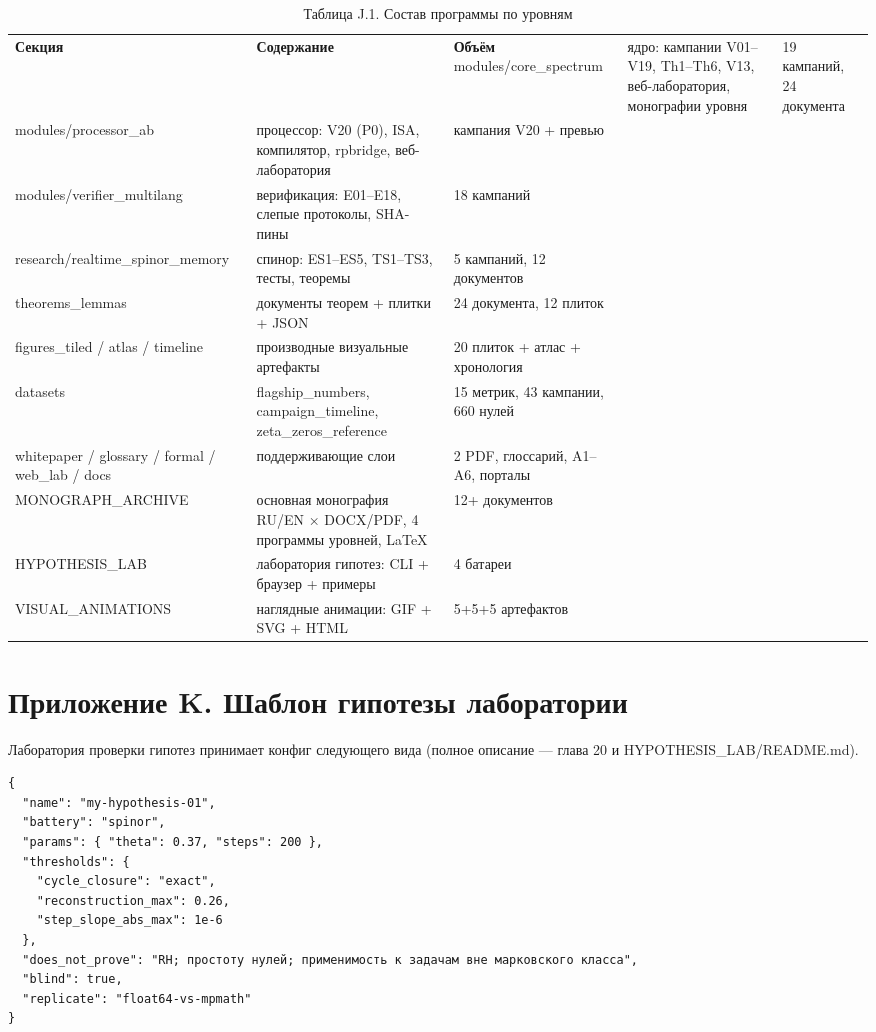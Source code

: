 \documentclass[11pt,a4paper]{article}
\begin{document}
\begin{table}[htbp]\centering\small
\caption{Таблица J.1. Состав программы по уровням}
\begin{tabular}{p{} p{} p{}}
\toprule
\textbf{Секция} & \textbf{Содержание} & \textbf{Объём}
\midrule
modules/core\_spectrum & ядро: кампании V01–V19, Th1–Th6, V13, веб-лаборатория, монографии уровня & 19 кампаний, 24 документа \\
modules/processor\_ab & процессор: V20 (P0), ISA, компилятор, rpbridge, веб-лаборатория & кампания V20 + превью \\
modules/verifier\_multilang & верификация: E01–E18, слепые протоколы, SHA-пины & 18 кампаний \\
research/realtime\_spinor\_memory & спинор: ES1–ES5, TS1–TS3, тесты, теоремы & 5 кампаний, 12 документов \\
theorems\_lemmas & документы теорем + плитки + JSON & 24 документа, 12 плиток \\
figures\_tiled / atlas / timeline & производные визуальные артефакты & 20 плиток + атлас + хронология \\
datasets & flagship\_numbers, campaign\_timeline, zeta\_zeros\_reference & 15 метрик, 43 кампании, 660 нулей \\
whitepaper / glossary / formal / web\_lab / docs & поддерживающие слои & 2 PDF, глоссарий, A1–A6, порталы \\
MONOGRAPH\_ARCHIVE & основная монография RU/EN × DOCX/PDF, 4 программы уровней, LaTeX & 12+ документов \\
HYPOTHESIS\_LAB & лаборатория гипотез: CLI + браузер + примеры & 4 батареи \\
VISUAL\_ANIMATIONS & наглядные анимации: GIF + SVG + HTML & 5+5+5 артефактов \\
\bottomrule
\end{tabular}
\end{table}

\section{Приложение K. Шаблон гипотезы лаборатории}

Лаборатория проверки гипотез принимает конфиг следующего вида (полное описание — глава 20 и HYPOTHESIS\_LAB/README.md).

\begin{verbatim}
{
  "name": "my-hypothesis-01",
  "battery": "spinor",
  "params": { "theta": 0.37, "steps": 200 },
  "thresholds": {
    "cycle_closure": "exact",
    "reconstruction_max": 0.26,
    "step_slope_abs_max": 1e-6
  },
  "does_not_prove": "RH; простоту нулей; применимость к задачам вне марковского класса",
  "blind": true,
  "replicate": "float64-vs-mpmath"
}
\end{verbatim}
\end{document}
